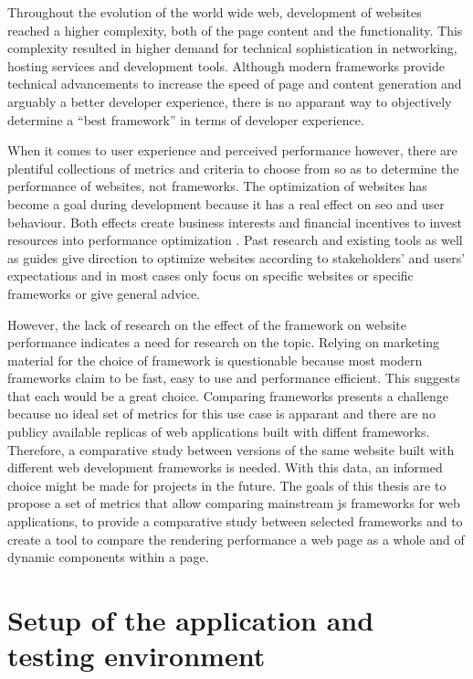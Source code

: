 \documentclass[a4paper, 12pt]{article}
\begin{document}
Throughout the evolution of the world wide web, development of websites reached a higher complexity, both of the page content and the functionality.
This complexity resulted in higher demand for technical sophistication in networking, hosting services and development tools.
Although modern frameworks provide technical advancements to increase the speed of page and content generation and arguably a better developer experience, there is no apparant way to objectively determine a \enquote{best framework} in terms of developer experience.

When it comes to user experience and perceived performance however, there are plentiful collections of metrics and criteria to choose from so as to determine the performance of websites, not frameworks.
The optimization of websites has become a goal during development because it has a real effect on \acrlong{seo} and user behaviour.
Both effects create business interests and financial incentives to invest resources into performance optimization \citep{webprophet,effectsofwebpagecontents}.
Past research and existing tools as well as guides give direction to optimize websites according to stakeholders' and users' expectations and in most cases only focus on specific websites or specific frameworks or give general advice.

However, the lack of research on the effect of the framework on website performance indicates a need for research on the topic.
Relying on marketing material for the choice of framework is questionable because most modern frameworks claim to be fast, easy to use and performance efficient.
This suggests that each would be a great choice.
Comparing frameworks presents a challenge because no ideal set of metrics for this use case is apparant and there are no publicy available replicas of web applications built with diffent frameworks.
Therefore, a comparative study between versions of the same website built with different web development frameworks is needed.
With this data, an informed choice might be made for projects in the future.
The goals of this thesis are to propose a set of metrics that allow comparing mainstream \acrfull{js} frameworks for web applications, to provide a comparative study between selected frameworks and to create a tool to compare the rendering performance a web page as a whole and of dynamic components within a page.

\section{Setup of the application and testing environment}
\end{document}
